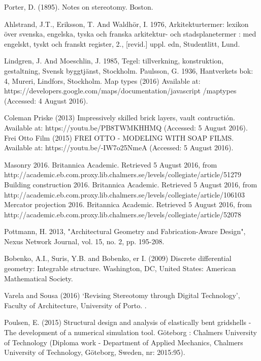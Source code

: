 \begin{thebibliography}{69}
Porter, D. (1895). Notes on stereotomy. Boston.

 Ahlstrand, J.T., Eriksson, T. And Waldhör, I. 1976, Arkitekturtermer: lexikon över svenska, engelska, tyska och franska arkitektur- och stadsplanetermer : med engelskt, tyskt och franskt register, 2., [revid.] uppl. edn, Studentlitt, Lund.

Lindgren, J. And Moeschlin, J. 1985, Tegel: tillverkning, konstruktion, gestaltning, Svensk byggtjänst, Stockholm.
 Paulsson, G. 1936, Hantverkets bok: 4, Mureri, Lindfors, Stockholm.
 Map types (2016) Available at: https://developers.google.com/maps/documentation/javascript
/maptypes (Accessed: 4 August 2016).

 Coleman Priske (2013) Impressively skilled brick layers, vault contructión. Available at: https://youtu.be/PB8TWMKHHMQ (Accessed: 5 August 2016).
Frei Otto Film (2015) FREI OTTO - MODELING WITH SOAP FILMS. Available at: https://youtu.be/-IW7o25NmeA (Accessed: 5 August 2016).

Masonry 2016. Britannica Academic. Retrieved 5 August 2016, from http://academic.eb.com.proxy.lib.chalmers.se/levels/collegiate/article/51279
Building construction 2016. Britannica Academic. Retrieved 5 August 2016, from http://academic.eb.com.proxy.lib.chalmers.se/levels/collegiate/article/106103
Mercator projection 2016. Britannica Academic. Retrieved 5 August 2016, from http://academic.eb.com.proxy.lib.chalmers.se/levels/collegiate/article/52078

Pottmann, H. 2013, "Architectural Geometry and Fabrication-Aware Design", Nexus Network Journal, vol. 15, no. 2, pp. 195-208.

Bobenko, A.I., Suris, Y.B. and Bobenko, er I. (2009) Discrete differential geometry: Integrable structure. Washington, DC, United States: American Mathematical Society.

Varela and Sousa (2016) ‘Revising Stereotomy through Digital Technology’, Faculty of Architecture, University of Porto. .

Poulsen, E. (2015) Structural design and analysis of elastically bent gridshells - The development of a numerical simulation tool. Göteborg : Chalmers University of Technology (Diploma work - Department of Applied Mechanics, Chalmers University of Technology, Göteborg, Sweden, nr: 2015:95).




\end{thebibliography}
